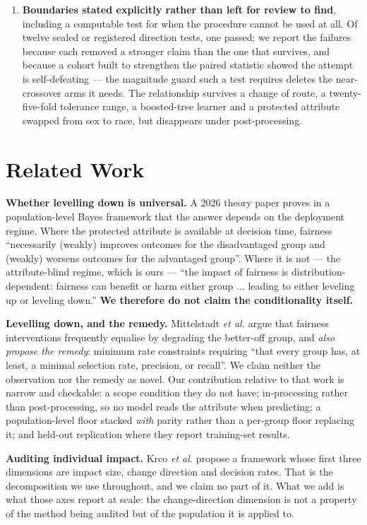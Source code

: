 \documentclass[conference]{IEEEtran}
\begin{document}
\begin{enumerate}
\item \textbf{Boundaries stated explicitly rather than left for review to find}, including a
computable test for when the procedure cannot be used at all. Of twelve sealed or registered direction tests, one passed; we report the failures because each removed a stronger claim
than the one that survives, and because a cohort built to strengthen the paired statistic
showed the attempt is self-defeating --- the magnitude guard such a test requires deletes
the near-crossover arms it needs. The relationship survives a change of route, a
twenty-five-fold tolerance range, a boosted-tree learner and a protected attribute swapped
from sex to race, but disappears under post-processing.
\end{enumerate}

\section{Related Work}
\label{sec:related}


\textbf{Whether levelling down is universal.} A 2026 theory paper \cite{backfire2026} proves in
a population-level Bayes framework that the answer depends on the deployment regime. Where the
protected attribute is available at decision time, fairness ``necessarily (weakly) improves
outcomes for the disadvantaged group and (weakly) worsens outcomes for the advantaged group''.
Where it is not --- the attribute-blind regime, which is ours --- ``the impact of fairness is
distribution-dependent: fairness can benefit or harm either group $\ldots$ leading to either
leveling up or leveling down.'' \textbf{We therefore do not claim the conditionality itself.}

\textbf{Levelling down, and the remedy.} Mittelstadt \emph{et al.} \cite{mittelstadt2023} argue
that fairness interventions frequently equalise by degrading the better-off group, and
\emph{also propose the remedy}: minimum rate constraints requiring ``that every group has, at
least, a minimal selection rate, precision, or recall''. We claim neither the observation nor
the remedy as novel. Our contribution relative to that work is narrow and checkable: a scope
condition they do not have; in-processing rather than post-processing, so no model reads the
attribute when predicting; a population-level floor stacked \emph{with} parity rather than a
per-group floor replacing it; and held-out replication where they report training-set results.

\textbf{Auditing individual impact.} Krco \emph{et al.} \cite{ferry2023} propose a framework
whose first three dimensions are impact size, change direction and decision rates. That is the
decomposition we use throughout, and we claim no part of it. What we add is what those axes
report at scale: the change-direction dimension is not a property of the method being audited
but of the population it is applied to.
\end{document}
